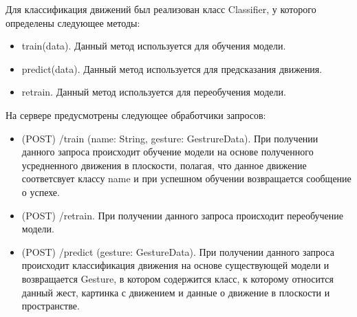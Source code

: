 Для классификация движений был реализован класс Classifier, у которого определены следующее методы:
\begin{itemize}
  \item train(data). Данный метод используется для обучения модели.
  \item predict(data). Данный метод используется для предсказания движения.
  \item retrain. Данный метод используется для переобучения модели.
\end{itemize}

На сервере предусмотрены следующее обработчики запросов:
\begin{itemize}
  \item (POST) /train (name: String, gesture: GestrureData). При получении данного запроса происходит обучение модели на основе полученного усредненного движения в плоскости, полагая, что данное движение соответсвует классу name и при успешном обучении возвращается сообщение о успехе.
  \item (POST) /retrain. При получении данного запроса происходит переобучение модели.

  \item (POST) /predict (gesture: GestureData). При получении данного запроса происходит классификация движения на основе существующей модели и возвращается Gesture, в котором содержится класс, к которому относится данный жест, картинка с движением и данные о движение в плоскости и пространстве.
\end{itemize}
